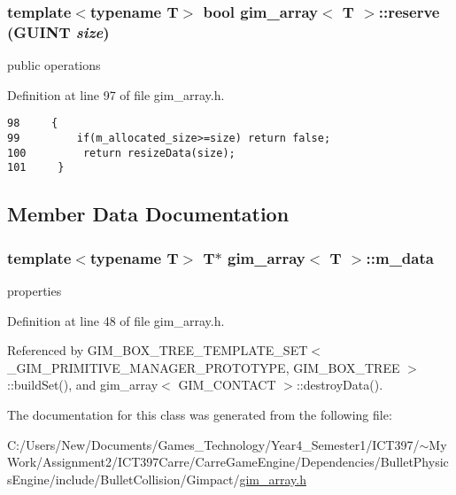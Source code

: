 \hypertarget{classgim__array_572f94b5b67d505335150a2dea8a7e3d}{
\subsubsection[reserve]{\setlength{\rightskip}{0pt plus 5cm}template$<$typename T$>$ bool {\bf gim\_\-array}$<$ T $>$::reserve (GUINT {\em size})}}
\label{classgim__array_572f94b5b67d505335150a2dea8a7e3d}


public operations 

Definition at line 97 of file gim\_\-array.h.

\begin{Code}\begin{verbatim}98     {
99         if(m_allocated_size>=size) return false;
100         return resizeData(size);
101     }
\end{verbatim}
\end{Code}




\subsection{Member Data Documentation}
\hypertarget{classgim__array_afb886b0fb48bed8c878d8a82dc4099c}{
\subsubsection[m\_\-data]{\setlength{\rightskip}{0pt plus 5cm}template$<$typename T$>$ T$\ast$ {\bf gim\_\-array}$<$ T $>$::{\bf m\_\-data}}}
\label{classgim__array_afb886b0fb48bed8c878d8a82dc4099c}


properties 

Definition at line 48 of file gim\_\-array.h.

Referenced by GIM\_\-BOX\_\-TREE\_\-TEMPLATE\_\-SET$<$ \_\-GIM\_\-PRIMITIVE\_\-MANAGER\_\-PROTOTYPE, GIM\_\-BOX\_\-TREE $>$::buildSet(), and gim\_\-array$<$ GIM\_\-CONTACT $>$::destroyData().

The documentation for this class was generated from the following file:\begin{CompactItemize}
\item 
C:/Users/New/Documents/Games\_\-Technology/Year4\_\-Semester1/ICT397/$\sim$My Work/Assignment2/ICT397Carre/CarreGameEngine/Dependencies/BulletPhysicsEngine/include/BulletCollision/Gimpact/\hyperlink{gim__array_8h}{gim\_\-array.h}\end{CompactItemize}
